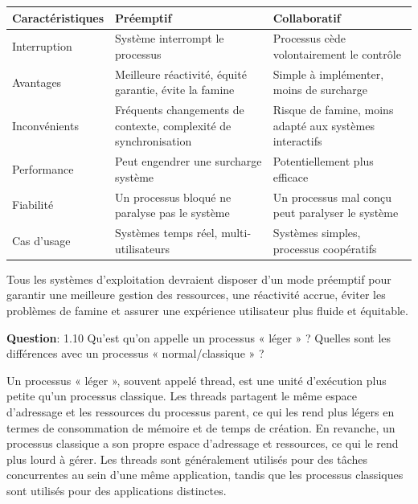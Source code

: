\begin{center}
\setlength{\tabcolsep}{10pt}

\begin{tabular}{|p{}|p{}|p{}|}
\hline
\textbf{Caractéristiques} & \textbf{Préemptif} & \textbf{Collaboratif} \\ \hline

Interruption & Système interrompt le processus & Processus cède volontairement le contrôle \\ \hline

Avantages & Meilleure réactivité, équité garantie, évite la famine & Simple à implémenter, moins de surcharge \\ \hline

Inconvénients & Fréquents changements de contexte, complexité de synchronisation & Risque de famine, moins adapté aux systèmes interactifs \\ \hline

Performance & Peut engendrer une surcharge système & Potentiellement plus efficace \\ \hline

Fiabilité & Un processus bloqué ne paralyse pas le système & Un processus mal conçu peut paralyser le système \\ \hline

Cas d'usage & Systèmes temps réel, multi-utilisateurs & Systèmes simples, processus coopératifs \\ \hline

\end{tabular}
\end{center}

\vspace{0.5cm}

\noindent Tous les systèmes d'exploitation devraient disposer d'un mode préemptif pour garantir une meilleure gestion des ressources, une réactivité accrue, éviter les problèmes de famine et assurer une expérience utilisateur plus fluide et équitable.

\vspace{0.5cm}

\noindent \textbf{Question}: 1.10 Qu'est qu'on appelle un processus « léger » ? Quelles sont les différences avec un processus « normal/classique » ?

\noindent Un processus « léger », souvent appelé thread, est une unité d'exécution plus petite qu'un processus classique. Les threads partagent le même espace d'adressage et les ressources du processus parent, ce qui les rend plus légers en termes de consommation de mémoire et de temps de création. En revanche, un processus classique a son propre espace d'adressage et ressources, ce qui le rend plus lourd à gérer. Les threads sont généralement utilisés pour des tâches concurrentes au sein d'une même application, tandis que les processus classiques sont utilisés pour des applications distinctes.

